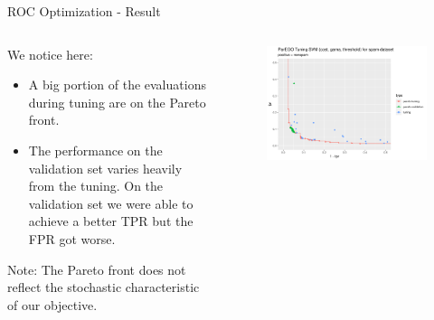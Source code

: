 \begin{frame}{ROC Optimization - Result}

\begin{columns}
\begin{column}{0.45\textwidth}
  We notice here:
  \begin{itemize}
    \item A big portion of the evaluations during tuning are on the Pareto front.
    \item The performance on the validation set varies heavily from the tuning.
    On the validation set we were able to achieve a better TPR but the FPR got worse.
  \end{itemize}
  Note: The Pareto front does not reflect the stochastic characteristic of our objective.
\end{column}%
\begin{column}{0.5\textwidth}
  \begin{figure}
  \includegraphics[width=\textwidth]{images/example_parego_spam.png}
  \end{figure}
\end{column}
\end{columns}
    
\end{frame}

